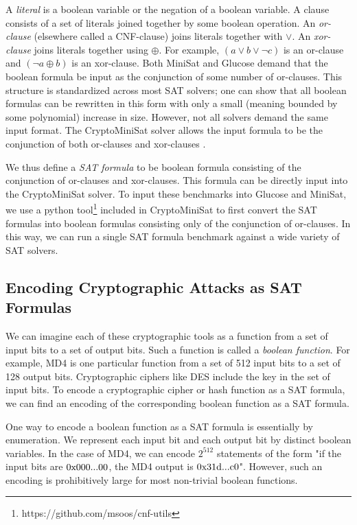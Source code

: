 A \emph{literal} is a boolean variable or the negation of a boolean variable. A clause consists of a set of literals joined together by some boolean operation. An \emph{or-clause} (elsewhere called a CNF-clause) joins literals together with $\lor$. An \emph{xor-clause} joins literals together using $\oplus$. For example, $(a \lor b \lor \neg c)$ is an or-clause and $(\neg a \oplus b)$ is an xor-clause. Both MiniSat and Glucose demand that the boolean formula be input as the conjunction of some number of or-clauses. This structure is standardized across most SAT solvers; one can show that all boolean formulas can be rewritten in this form with only a small (meaning bounded by some polynomial) increase in size. However, not all solvers demand the same input format. The CryptoMiniSat \cite{SNC09} solver allows the input formula to be the conjunction of both or-clauses and xor-clauses . 

We thus define a \emph{SAT formula} to be boolean formula consisting of the conjunction of or-clauses and xor-clauses. This formula can be directly input into the CryptoMiniSat solver. To input these benchmarks into Glucose and MiniSat, we use a python tool\footnote{https://github.com/msoos/cnf-utils} included in CryptoMiniSat to first convert the SAT formulas into boolean formulas consisting only of the conjunction of or-clauses. In this way, we can run a single SAT formula benchmark against a wide variety of SAT solvers.


\subsection{Encoding Cryptographic Attacks as SAT Formulas}
\label{sec:encoding:desc}
We can imagine each of these cryptographic tools as a function from a set of input bits to a set of output 
bits. Such a function is called a \emph{boolean function}. For example, MD4 is one particular function from a set of 512 input bits to a set of 128 output bits. Cryptographic ciphers like DES include the key in the set of input bits. To encode a cryptographic cipher or hash function as a SAT formula, we can find an encoding of the corresponding boolean function as a SAT formula.

One way to encode a boolean function as a SAT formula is essentially by enumeration. We represent each input bit and each output bit by distinct boolean variables. In the case of MD4, we can encode $2^{512}$ statements of the form "if the input bits are $0\text{x000...00}$, the MD4 output is $0\text{x31d...c0}$". However, such an encoding is prohibitively large for most non-trivial boolean functions.

